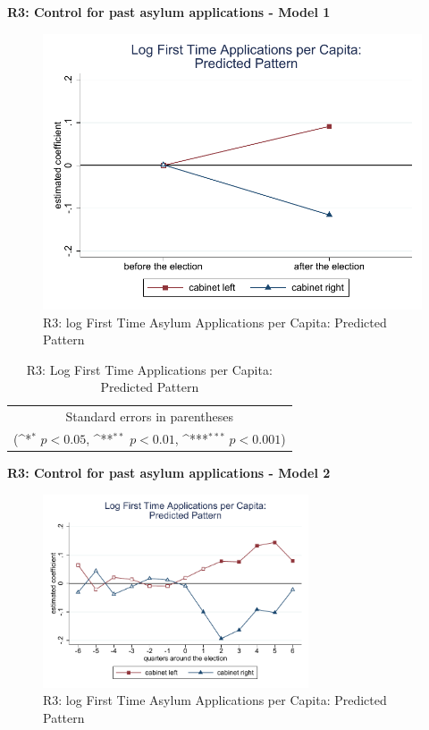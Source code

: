 \documentclass[10pt,a4paper]{scrartcl}
\begin{document}
\clearpage
\textbf{R3: Control for past asylum applications - Model 1}
\begin{figure}[!ht]
	\centering
	\includegraphics[width=1\textwidth]{figures_edited/app_graph1_R3.pdf}
	\caption{R3: log First Time Asylum Applications per Capita: Predicted Pattern}
\end{figure}

\begin{table}[!ht]\centering
	\renewcommand{\arraystretch}{1.25}
	\def\sym#1{\ifmmode^{#1}\else\(^{#1}\)\fi}
	\caption{R3: Log First Time Applications per Capita: Predicted Pattern}
	\begin{tabular}{l*{2}{c}}
		\hline\hline
		
		\hline\hline
		\multicolumn{3}{c}{\footnotesize Standard errors in parentheses} \\
	    \multicolumn{3}{c}{\footnotesize (\sym{*} \(p<0.05\), \sym{**} \(p<0.01\), \sym{***} \(p<0.001\))}\\
	\end{tabular}
\end{table}

\clearpage
\textbf{R3: Control for past asylum applications - Model 2}
\begin{figure}[!ht]
	\centering
	\includegraphics[width=0.7\textwidth]{figures_edited/app_graph2_R3.pdf}
	\caption{R3: log First Time Asylum Applications per Capita: Predicted Pattern}
\end{figure}
\end{document}
